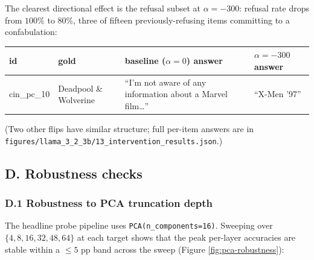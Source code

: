 The clearest directional effect is the refusal subset at
\(\alpha = -300\): refusal rate drops from \(100\%\) to \(80\%\), three
of fifteen previously-refusing items committing to a confabulation:

\begin{center}
\small
\begin{tabular}{@{}
  >{\raggedright\arraybackslash}p{}
  >{\raggedright\arraybackslash}p{}
  >{\raggedright\arraybackslash}p{}
  >{\raggedright\arraybackslash}p{}@{}}
\toprule
\begin{minipage}[b]{\linewidth}\raggedright
id
\end{minipage} & \begin{minipage}[b]{\linewidth}\raggedright
gold
\end{minipage} & \begin{minipage}[b]{\linewidth}\raggedright
baseline (\(\alpha=0\)) answer
\end{minipage} & \begin{minipage}[b]{\linewidth}\raggedright
\(\alpha=-300\) answer
\end{minipage} \\\midrule
cin\_pc\_10 & Deadpool \& Wolverine & ``I'm not aware of any information
about a Marvel film\ldots{}'' & ``X-Men '97'' \\
\bottomrule
\end{tabular}
\end{center}

(Two other flips have similar structure; full per-item answers are in
\texttt{figures/llama\_3\_2\_3b/13\_intervention\_results.json}.)

\subsection{D. Robustness checks}\label{d.-robustness-checks}

\subsubsection{D.1 Robustness to PCA truncation
depth}\label{d.1-robustness-to-pca-truncation-depth}

The headline probe pipeline uses \texttt{PCA(n\_components=16)}.
Sweeping over \(\{4, 8, 16, 32, 48,
64\}\) at each target shows that the peak per-layer accuracies are
stable within a \(\le 5\) pp band across the sweep (Figure
\ref{fig:pca-robustness}):

